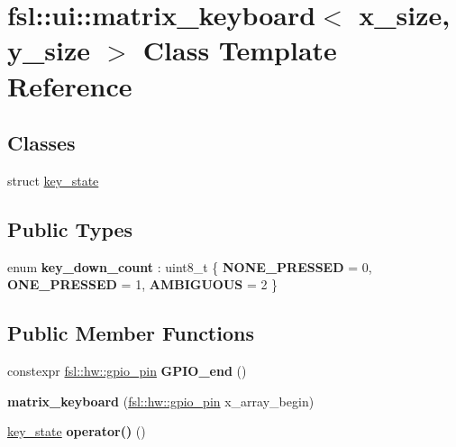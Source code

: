 \hypertarget{classfsl_1_1ui_1_1matrix__keyboard}{}\section{fsl\+::ui\+::matrix\+\_\+keyboard$<$ x\+\_\+size, y\+\_\+size $>$ Class Template Reference}
\label{classfsl_1_1ui_1_1matrix__keyboard}
\subsection*{Classes}
\begin{DoxyCompactItemize}
\item 
struct \mbox{\hyperlink{structfsl_1_1ui_1_1matrix__keyboard_1_1key__state}{key\+\_\+state}}
\end{DoxyCompactItemize}
\subsection*{Public Types}
\begin{DoxyCompactItemize}
\item 
\mbox{\label{classfsl_1_1ui_1_1matrix__keyboard_a2ebd2b107caf7d6ebae186e3cb803406}} 
enum {\bfseries key\+\_\+down\+\_\+count} \+: uint8\+\_\+t \{ {\bfseries N\+O\+N\+E\+\_\+\+P\+R\+E\+S\+S\+ED} = 0, 
{\bfseries O\+N\+E\+\_\+\+P\+R\+E\+S\+S\+ED} = 1, 
{\bfseries A\+M\+B\+I\+G\+U\+O\+US} = 2
 \}
\end{DoxyCompactItemize}
\subsection*{Public Member Functions}
\begin{DoxyCompactItemize}
\item 
\mbox{\label{classfsl_1_1ui_1_1matrix__keyboard_a661dedd553ab75b0282897daa4d96032}} 
constexpr \mbox{\hyperlink{classfsl_1_1hw_1_1gpio__pin}{fsl\+::hw\+::gpio\+\_\+pin}} {\bfseries G\+P\+I\+O\+\_\+end} ()
\item 
\mbox{\label{classfsl_1_1ui_1_1matrix__keyboard_ac63b432ff6b9c60fed1a9abea80637ec}} 
{\bfseries matrix\+\_\+keyboard} (\mbox{\hyperlink{classfsl_1_1hw_1_1gpio__pin}{fsl\+::hw\+::gpio\+\_\+pin}} x\+\_\+array\+\_\+begin)
\item 
\mbox{\label{classfsl_1_1ui_1_1matrix__keyboard_aa042d1a809f07490dc415b5d5af2cd01}} 
\mbox{\hyperlink{structfsl_1_1ui_1_1matrix__keyboard_1_1key__state}{key\+\_\+state}} {\bfseries operator()} ()
\end{DoxyCompactItemize}
